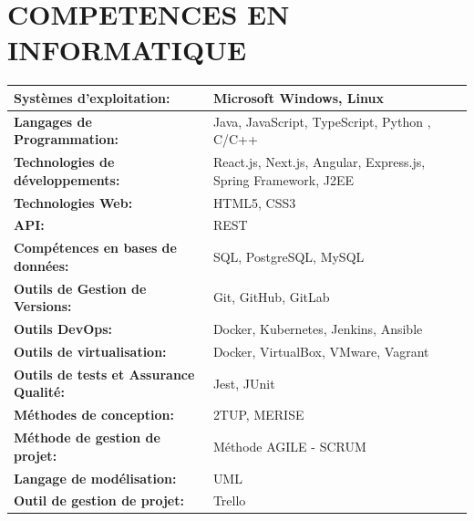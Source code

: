 \documentclass[12pt]{report}
\begin{document}
			\section*{COMPETENCES EN INFORMATIQUE}
			\begin{center}
				\begin{minipage}{\textwidth}
					\begin{center}
						\begin{tabularx}{\textwidth}{|X|X|}
							\hline
							\textbf{Systèmes d'exploitation:} & Microsoft Windows, Linux\\
							\hline
							\textbf{Langages de Programmation:} & Java, JavaScript, TypeScript, Python , C/C++\\
							\hline
							\textbf{Technologies de développements:} &  React.js, Next.js, Angular, Express.js, Spring Framework, J2EE\\
							\hline
							\textbf{Technologies Web:} & HTML5, CSS3\\
							\hline
							\textbf{API:} & REST\\
							\hline
							\textbf{Compétences en bases de données:} &  SQL, PostgreSQL, MySQL\\
							\hline
							\textbf{Outils de Gestion de Versions:} & Git, GitHub, GitLab\\
							\hline
							\textbf{Outils DevOps:} &  Docker, Kubernetes, Jenkins, Ansible\\
							\hline
							\textbf{Outils de virtualisation:} & Docker, VirtualBox, VMware, Vagrant\\
							\hline
							\textbf{Outils de tests et Assurance Qualité:} & Jest, JUnit\\
							\hline
							\textbf{Méthodes de conception:} &2TUP, MERISE\\
							\hline
							\textbf{Méthode de gestion de projet:} &Méthode AGILE - SCRUM\\
							\hline
							\textbf{Langage de modélisation:} & UML\\
							\hline
							\textbf{Outil de gestion de projet:} & Trello\\
							\hline
						\end{tabularx}
					\end{center}
	   			\end{minipage}		
			\end{center}
\end{document}
